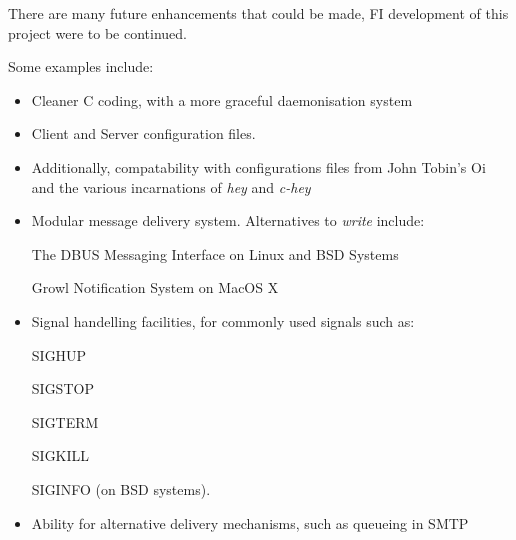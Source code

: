 There are many future enhancements that could be made, FI development of
this project were to be continued.

Some examples include:

\begin{itemize}

\item Cleaner C coding, with a more graceful daemonisation system

\item Client and Server configuration files.

	\item Additionally, compatability with configurations files from John
	Tobin's Oi and the various incarnations of \emph{hey} and 
	\emph{c-hey}

\item Modular message delivery system. Alternatives to \emph{write} 
include:

	\subitem The DBUS Messaging Interface on Linux and BSD Systems

	\subitem Growl Notification System on MacOS X

\item Signal handelling facilities, for commonly used signals such as:
	
	\subitem SIGHUP 
	
	\subitem SIGSTOP

	\subitem SIGTERM

	\subitem SIGKILL 

	\subitem SIGINFO (on BSD systems).

\item Ability for alternative delivery mechanisms, such as queueing in
SMTP

\end{itemize}
